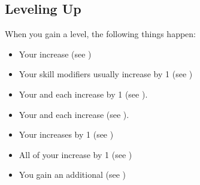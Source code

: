     \subsection{Leveling Up}
        When you gain a level, the following things happen:
        \begin{itemize}
            \item Your  increase (see )
            \item Your skill modifiers usually increase by 1 (see )
            \item Your  and  each increase by 1 (see ).
            \item Your  and  each increase (see ).
            \item Your  increases by 1 (see )
            \item All of your  increase by 1 (see )
            \item You gain an additional  (see )
        \end{itemize}
